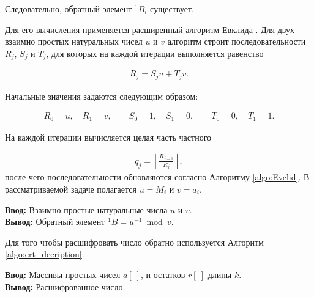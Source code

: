 \documentclass{crm-article}
\begin{document}
Следовательно, обратный элемент $^1B_i$ существует.

Для его вычисления применяется расширенный алгоритм Евклида \cite{Okulov2011}. Для двух взаимно простых натуральных чисел $u$ и $v$ алгоритм строит последовательности $R_j$, $S_j$ и $T_j$, для которых на каждой итерации выполняется равенство

\begin{gather}
    R_j=S_j u+T_j v.
\end{gather}

Начальные значения задаются следующим образом:

\begin{gather}
    R_0=u,\quad R_1=v,\qquad
    S_0=1,\quad S_1=0,\qquad
    T_0=0,\quad T_1=1.
\end{gather}

На каждой итерации вычисляется целая часть частного

\begin{gather}
    q_j=\left\lfloor\frac{R_{j-1}}{R_j}\right\rfloor,
\end{gather}
после чего последовательности обновляются согласно Алгоритму \ref{algo:Evclid}. В рассматриваемой задаче полагается $u=M_i$ и $v=a_i$.

\begin{algorithm}[H]
    \textbf{Ввод:} Взаимно простые натуральные числа $u$ и $v$.\\
    \textbf{Вывод:} Обратный элемент $^1B=u^{-1}\bmod v$.
    \begin{algorithmic}
        \ENDWHILE
    \end{algorithmic}
    \caption{Вычисление обратного элемента с использованием
    расширенного алгоритма Евклида.}
    \label{algo:Evclid}
\end{algorithm}

Для того чтобы расшифровать число обратно используется Алгоритм \ref{algo:crt_decription}.

\begin{algorithm}[H]
	\textbf{Ввод:} Массивы простых чисел $a[~]$, и остатков $r[~]$ длины $k$.\\
	\textbf{Вывод:} Расшифрованное число.
	\begin{algorithmic}
	\end{algorithmic}
	\caption{Восстановление числа из простых чисел и остатков от делений на них.}
	\label{algo:crt_decription}
\end{algorithm}
\end{document}
